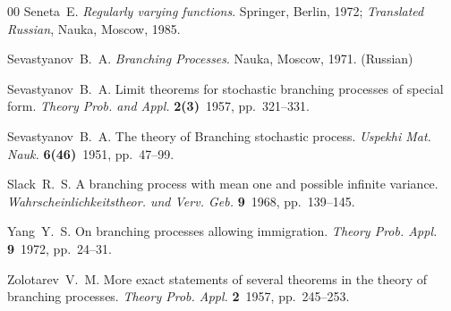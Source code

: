 \documentclass[10pt,reqno]{amsart}
\theoremstyle{definition}
\numberwithin{equation}{section}
\begin{document}
\begin{thebibliography}{00}
    {\sc Seneta~E.}
    \textit{Regularly varying functions}. {Springer}, Berlin, 1972; \textit{Translated Russian}, Nauka, Moscow, 1985.

    {\sc Sevastyanov~B.~A.}
    \textit{Branching Processes}. Nauka, Moscow, 1971. (Russian)

    {\sc Sevastyanov~B.~A.}
    {Limit theorems for stochastic branching processes of special form.}
    \textit{Theory Prob. and Appl.} \textbf{2(3)}~1957, pp.~321--331.

    {\sc Sevastyanov~B.~A.}
    {The theory of Branching stochastic process.}
    \textit{Uspekhi Mat. Nauk.} \textbf{6(46)}~1951, pp.~47--99.

    {\sc Slack~R.~S.}
    {A branching process with mean one and possible infinite variance.}
    \textit{Wahrscheinlichkeitstheor. und Verv. Geb.} \textbf{9}~1968, pp.~139--145.

    {\sc Yang~Y.~S.}
    {On branching processes allowing immigration.}
    \textit{Theory Prob. Appl.}  \textbf{9}~1972, pp.~24--31.

    {\sc Zolotarev~V.~M.}
    {More exact statements of several theorems in the theory of branching processes.}
    \textit{Theory Prob. Appl.}  \textbf{2}~1957, pp.~245--253.

\end{thebibliography}
\end{document}
